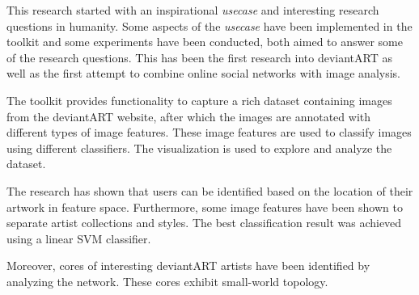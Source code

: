 This research started with an inspirational \textit{usecase} and interesting research questions in humanity.
Some aspects of the \textit{usecase} have been implemented in the toolkit and some experiments have been conducted, both aimed to answer some of the research questions.
This has been the first research into deviantART as well as the first attempt to combine online social networks with image analysis.

The toolkit provides functionality to capture a rich dataset containing images from the deviantART website, after which the images are annotated with different types of image features. These image features are used to classify images using different classifiers. The visualization is used to explore and analyze the dataset.

The research has shown that users can be identified based on the location of their artwork in feature space. Furthermore, some image features have been shown to separate artist collections and styles. The best classification result was achieved using a linear SVM classifier.

Moreover, cores of interesting deviantART artists have been identified by analyzing the network. These cores exhibit small-world topology. 
